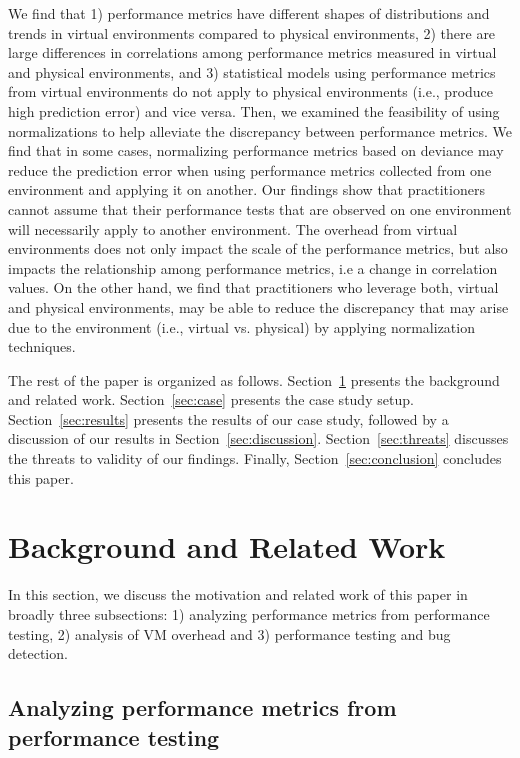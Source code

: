 \documentclass[smallextended]{svjour3}       %
\begin{document}
We find that 1) performance metrics have different shapes of distributions and trends in virtual environments compared to physical environments, 2) there are large differences in correlations among performance metrics measured in virtual and physical environments, and 3) statistical models using performance metrics from virtual environments do not apply to physical environments (i.e., produce high prediction error) and vice versa. Then, we examined the feasibility of using normalizations to help alleviate the discrepancy between performance metrics. We find that in some cases, normalizing performance metrics based on deviance may reduce the prediction error when using performance metrics collected from one environment and applying it on another. Our findings show that practitioners cannot assume that their performance tests that are observed on one environment will necessarily apply to another environment. The overhead from virtual environments does not only impact the scale of the performance metrics, but also impacts the relationship among performance metrics, i.e a change in correlation values. On the other hand, we find that practitioners who leverage both, virtual and physical environments, may be able to reduce the discrepancy that may arise due to the environment (i.e., virtual vs. physical) by applying normalization techniques.

The rest of the paper is organized as follows. Section~\ref{sec:related} presents the background and related work. Section~\ref{sec:case} presents the case study setup. Section~\ref{sec:results} presents the results of our case study, followed by a discussion of our results in Section~\ref{sec:discussion}. Section~\ref{sec:threats} discusses the threats to validity of our findings. Finally, Section~\ref{sec:conclusion} concludes this paper.


\section{Background and Related Work}
\label{sec:related}
In this section, we discuss the motivation and related work of this paper in broadly three subsections: 1) analyzing performance metrics from performance testing, 2) analysis of VM overhead and 3) performance testing and bug detection.


\subsection{Analyzing performance metrics from performance testing} 
\end{document}
